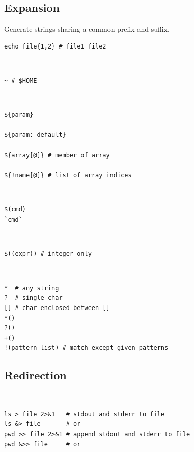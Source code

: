 \documentclass{article}
\begin{document}
\subsection{Expansion}
\begin{definition}
    Generate strings sharing a common prefix and suffix.
    \begin{verbatim}
echo file{1,2} # file1 file2
\end{verbatim}
\end{definition}

\begin{definition}~
    \begin{verbatim}
~ # $HOME
\end{verbatim}
\end{definition}

\begin{definition}~
    \begin{verbatim}
${param}

${param:-default}

${array[@]} # member of array

${!name[@]} # list of array indices
\end{verbatim}
\end{definition}

\begin{definition}~
    \begin{verbatim}
$(cmd)
`cmd`
\end{verbatim}
\end{definition}

\begin{definition}~
    \begin{verbatim}
$((expr)) # integer-only
\end{verbatim}
\end{definition}

\begin{definition}~
    \begin{verbatim}
*  # any string
?  # single char
[] # char enclosed between []
*()
?()
+()
!(pattern list) # match except given patterns
\end{verbatim}
\end{definition}

\subsection{Redirection}
\begin{definition}[redirection]~
    \begin{verbatim}
ls > file 2>&1   # stdout and stderr to file
ls &> file       # or
pwd >> file 2>&1 # append stdout and stderr to file
pwd &>> file     # or
\end{verbatim}
\end{definition}
\end{document}
